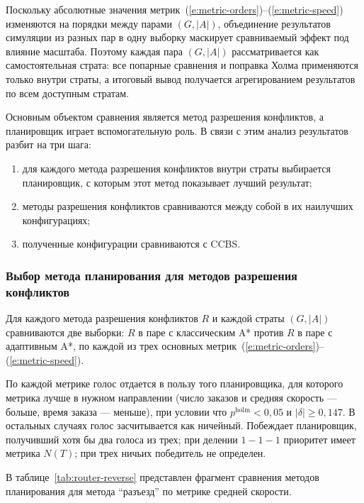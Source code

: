 Поскольку абсолютные значения метрик~(\ref{e:metric-orders})--(\ref{e:metric-speed}) изменяются на 
порядки между парами $(G, |A|)$, объединение результатов симуляции из разных пар в одну выборку 
маскирует сравниваемый эффект под влияние масштаба. Поэтому каждая пара $(G, |A|)$ рассматривается 
как самостоятельная страта: все попарные сравнения и поправка Холма применяются только внутри 
страты, а итоговый вывод получается агрегированием результатов по всем доступным стратам.

Основным объектом сравнения является метод разрешения конфликтов, а планировщик играет вспомогательную 
роль. В связи с этим анализ результатов разбит на три шага:

\begin{enumerate}
    \item для каждого метода разрешения конфликтов внутри страты выбирается
        планировщик, с которым этот метод показывает лучший результат;
    \item методы разрешения конфликтов сравниваются между собой в их
        наилучших конфигурациях;
    \item полученные конфигурации сравниваются с CCBS.
\end{enumerate}

\subsubsection{Выбор метода планирования для методов разрешения конфликтов}

Для каждого метода разрешения конфликтов $R$ и каждой страты $(G, |A|)$ сравниваются две выборки:
$R$ в паре с классическим A* против $R$ в паре с адаптивным A*, по каждой из трех основных 
метрик~(\ref{e:metric-orders})--(\ref{e:metric-speed}).

По каждой метрике голос отдается в пользу того планировщика, для которого метрика лучше в нужном 
направлении (число заказов и средняя скорость --- больше, время заказа --- меньше), при условии что 
$p^{\mathrm{holm}} < 0{,}05$ и $|\delta| \geq 0{,}147$. В остальных случаях голос засчитывается как 
ничейный. Побеждает планировщик, получивший хотя бы два голоса из трех; при делении $1{-}1{-}1$ 
приоритет имеет метрика $N(T)$; при трех ничьих победитель не определен.

В таблице~\ref{tab:router-reverse} представлен фрагмент сравнения методов планирования для метода \enquote{разъезд}
по метрике средней скорости.


